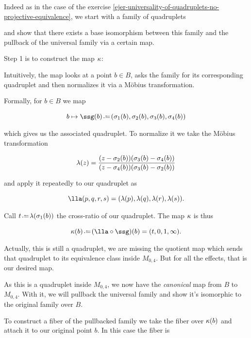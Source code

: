 \documentclass[12pt]{memoir}
\begin{document}
\begin{ptcbp}
    Indeed as in the case of the exercise \ref{ejer-universality-of-quadruplets-no-projective-equivalence}, we start with a family of quadruplets
    \begin{center}
    \end{center}
    and show that there exists a base isomorphism between this family and the pullback of the universal family via a certain map.\par
    Step 1 is to construct the map \(\kappa\):
    \begin{center}
    \end{center}

    Intuitively, the map looks at a point \(b\in B\), asks the family for its corresponding quadruplet and then normalizes it via a M\"obius transformation.\par
    Formally, for \(b\in B\) we map

    \[b\mapsto \ssg(b)\defeq (\sg_1(b),\sg_2(b),\sg_3(b),\sg_4(b))\]

    which gives us the associated quadruplet. To normalize it we take the M\"obius transformation

    \[\lambda(z)=\frac{(z-\sigma_2(b))(\sigma_3(b)-\sigma_4(b))}{(z-\sigma_4(b))(\sigma_3(b)-\sigma_2(b))}\]

    and apply it repeatedly to our quadruplet as

    \[\lla(p,q,r,s)=(\la(p),\la(q),\la(r),\la(s)).\]

    Call \(t\defeq\la(\sg_1(b))\) the cross-ratio of our quadruplet. The map \(\kappa\) is thus

    \[\kp(b)\defeq (\lla\circ\ssg)(b)=(t,0,1,\infty).\]

    Actually, this is still a quadruplet, we are missing the quotient map which sends that quadruplet to its equivalence class inside \(M_{0,4}\). But for all the effects, that is our desired map.\par
    As this is a quadruplet inside \(M_{0,4}\), we now have the \emph{canonical} map from \(B\) to \(M_{0,4}\). With it, we will pullback the universal family and show it's isomorphic to the original family over \(B\).\par
    To construct a fiber of the pullbacked family we take the fiber over \(\kappa(b)\) and attach it to our original point \(b\). In this case the fiber is


\end{ptcbp}
\end{document}

